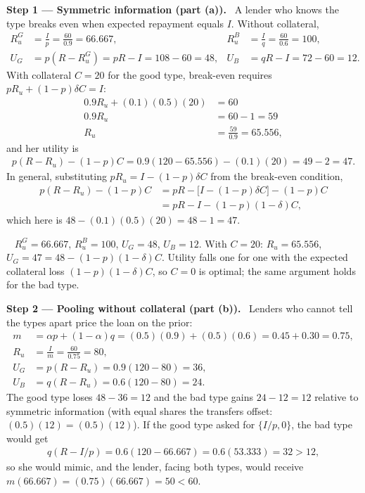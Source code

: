 \documentclass[11pt,a4paper]{article}
\newcommand{\step}[2]{\par\medskip\noindent\textbf{Step #1 --- #2.}~}
\newcommand{\answer}[1]{\par\smallskip\noindent\fbox{\textbf{Answer #1.}}~}
\begin{document}
\step{1}{Symmetric information (part (a))} A lender who knows the type breaks even when expected repayment equals $I$. Without collateral,
\begin{align}
  R_u^G &= \frac Ip = \frac{60}{0.9} = 66.667, & R_u^B &= \frac Iq = \frac{60}{0.6} = 100, \nonumber\\
  U_G &= p(R-R_u^G) = pR-I = 108-60 = 48, & U_B &= qR-I = 72-60 = 12. \nonumber
\end{align}
With collateral $C=20$ for the good type, break-even requires $pR_u+(1-p)\delta C=I$:
\begin{align}
  0.9R_u+(0.1)(0.5)(20) &= 60 \nonumber\\
  0.9R_u &= 60-1 = 59 \nonumber\\
  R_u &= \frac{59}{0.9} = 65.556, \nonumber
\end{align}
and her utility is
\begin{align}
  p(R-R_u)-(1-p)C = 0.9(120-65.556)-(0.1)(20) = 49-2 = 47. \nonumber
\end{align}
In general, substituting $pR_u=I-(1-p)\delta C$ from the break-even condition,
\begin{align}
  p(R-R_u)-(1-p)C &= pR-\bigl[I-(1-p)\delta C\bigr]-(1-p)C \nonumber\\
  &= pR-I-(1-p)(1-\delta)C, \label{t3e18-symC}
\end{align}
which here is $48-(0.1)(0.5)(20)=48-1=47$.

\answer{(a)} $R_u^G=66.667$, $R_u^B=100$, $U_G=48$, $U_B=12$. With $C=20$: $R_u=65.556$, $U_G=47=48-(1-p)(1-\delta)C$. Utility falls one for one with the expected collateral loss $(1-p)(1-\delta)C$, so $C=0$ is optimal; the same argument holds for the bad type.

\step{2}{Pooling without collateral (part (b))} Lenders who cannot tell the types apart price the loan on the prior:
\begin{align}
  m &= \alpha p+(1-\alpha)q = (0.5)(0.9)+(0.5)(0.6) = 0.45+0.30 = 0.75, \nonumber\\
  R_u &= \frac Im = \frac{60}{0.75} = 80, \nonumber\\
  U_G &= p(R-R_u) = 0.9(120-80) = 36, \nonumber\\
  U_B &= q(R-R_u) = 0.6(120-80) = 24. \nonumber
\end{align}
The good type loses $48-36=12$ and the bad type gains $24-12=12$ relative to symmetric information (with equal shares the transfers offset: $(0.5)(12)=(0.5)(12)$). If the good type asked for $\{I/p,0\}$, the bad type would get
\begin{align}
  q(R-I/p) = 0.6(120-66.667) = 0.6(53.333) = 32 > 12, \nonumber
\end{align}
so she would mimic, and the lender, facing both types, would receive $m(66.667)=(0.75)(66.667)=50<60$.
\end{document}
